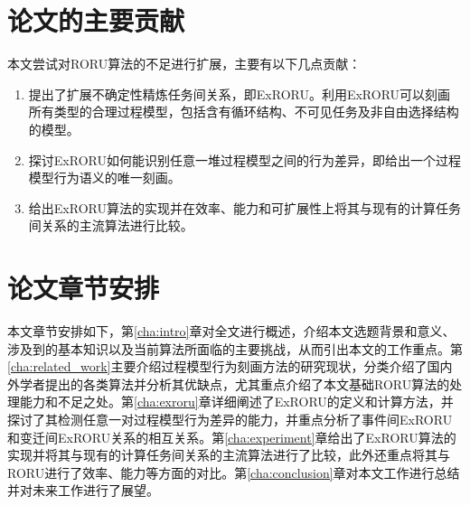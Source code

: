 \section{论文的主要贡献}\label{sec:contribution}
本文尝试对RORU算法\cite{jin2014computing}的不足进行扩展，主要有以下几点贡献：
\begin{enumerate}[1.]
  \item 提出了扩展不确定性精炼任务间关系，即ExRORU。利用ExRORU可以刻画所有类型的合理过程模型，包括含有循环结构、不可见任务及非自由选择结构的模型。
  \item 探讨ExRORU如何能识别任意一堆过程模型之间的行为差异，即给出一个过程模型行为语义的唯一刻画。
  \item 给出ExRORU算法的实现并在效率、能力和可扩展性上将其与现有的计算任务间关系的主流算法进行比较。
\end{enumerate}

\section{论文章节安排}\label{sec:structure}
本文章节安排如下，第\ref{cha:intro}章对全文进行概述，介绍本文选题背景和意义、涉及到的基本知识以及当前算法所面临的主要挑战，从而引出本文的工作重点。第\ref{cha:related_work}主要介绍过程模型行为刻画方法的研究现状，分类介绍了国内外学者提出的各类算法并分析其优缺点，尤其重点介绍了本文基础RORU算法的处理能力和不足之处。第\ref{cha:exroru}章详细阐述了ExRORU的定义和计算方法，并探讨了其检测任意一对过程模型行为差异的能力，并重点分析了事件间ExRORU和变迁间ExRORU关系的相互关系。第\ref{cha:experiment}章给出了ExRORU算法的实现并将其与现有的计算任务间关系的主流算法进行了比较，此外还重点将其与RORU进行了效率、能力等方面的对比。第\ref{cha:conclusion}章对本文工作进行总结并对未来工作进行了展望。
